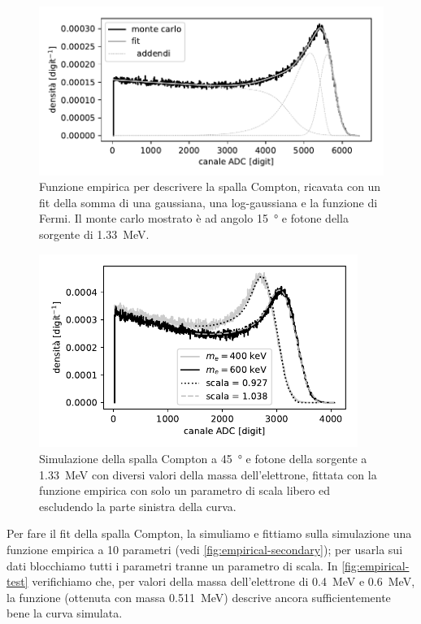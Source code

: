 \begin{figure}
	\centering
	\includegraphics[width=33em]{empirical-secondary}
	\caption{\label{fig:empirical-secondary}
	Funzione empirica per descrivere la spalla Compton,
	ricavata con un fit della somma di una gaussiana, una log-gaussiana e la funzione di Fermi.
	Il monte carlo mostrato è ad angolo \SI{15}{\degree} e fotone della sorgente di \SI{1.33}{MeV}.}
\end{figure}

\begin{figure}
	\centering
	\includegraphics[width=28em]{empirical-test}
	\caption{\label{fig:empirical-test}
	Simulazione della spalla Compton a \SI{45}{\degree} e fotone della sorgente a \SI{1.33}{MeV}
	con diversi valori della massa dell'elettrone,
	fittata con la funzione empirica con solo un parametro di scala libero
	ed escludendo la parte sinistra della curva.}
\end{figure}

Per fare il fit della spalla Compton,
la simuliamo e fittiamo sulla simulazione una funzione empirica a 10 parametri
(vedi \autoref{fig:empirical-secondary});
per usarla sui dati blocchiamo tutti i parametri tranne un parametro di scala.
In \autoref{fig:empirical-test} verifichiamo che,
per valori della massa dell'elettrone di \SI{0.4}{MeV} e \SI{0.6}{MeV},
la funzione (ottenuta con massa \SI{0.511}{MeV}) descrive ancora sufficientemente bene la curva simulata.

